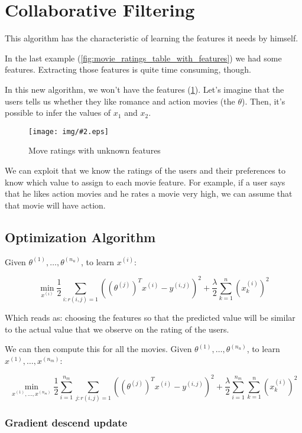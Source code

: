 \documentclass[10pt]{extarticle}
\newcommand{\stdfig}[3]{
    \begin{figure}
    \centering
    \texttt{[image: img/\#2.eps]}
    \caption{#3}
    \label{fig:#2}
    \end{figure}
}
\begin{document}
\section{Collaborative Filtering}\label{collaborative-filtering}

This algorithm has the characteristic of learning the features it needs
by himself. \smallskip

In the last example (\cref{fig:movie_ratings_table_with_features}) we
had some features. Extracting those features is quite time consuming,
though. \smallskip

In this new algorithm, we won't have the features
(\cref{fig:movie_ratings_table_unknown_features}). Let's imagine that
the users tells us whether they like romance and action movies (the
$\theta$). Then, it's possible to infer the values of $x_1$ and $x_2$.
\smallskip 

\stdfig{12cm}{movie_ratings_table_unknown_features}{Move ratings with unknown features}

We can exploit that we know the ratings of the users and their
preferences to know which value to assign to each movie feature. For
example, if a user says that he likes action movies and he rates a movie
very high, we can assume that that movie will have action.

\subsection{Optimization Algorithm}\label{optimization-algorithm}

Given $\theta^{(1)}, \dots, \theta^{(n_u)}$, to learn $x^{(i)}$:

\[ \min_{x^{(i)}}  \frac{1}{2} \sum_{i:r(i, j)=1} ((\theta^{(j)})^Tx^{(i)} - y^{(i,j)})^2 + \frac{\lambda}{2} \sum_{k=1}^n(x_k^{(i)})^2 \]

Which reads as: choosing the features so that the predicted value will
be similar to the actual value that we observe on the rating of the
users. \smallskip

We can then compute this for all the movies. Given
$\theta^{(1)}, \dots, \theta^{(n_u)}$, to learn
$x^{(1)}, \dots, x^{(n_m)}$:

\[ \min_{x^{(1)}, \dots, x^{(n_m)}}  \frac{1}{2} \sum_{i=1}^{n_m} \sum_{j:r(i, j)=1} ((\theta^{(j)})^Tx^{(i)} - y^{(i,j)})^2 + \frac{\lambda}{2} \sum_{i=1}^{n_m} \sum_{k=1}^n(x_k^{(i)})^2 \]

\subsubsection{Gradient descend update}\label{gradient-descend-update}
\end{document}
